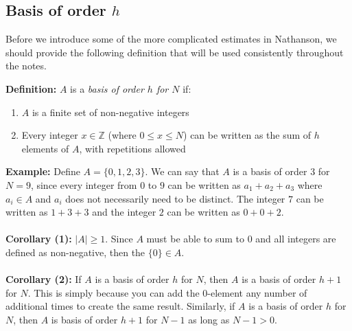 \documentclass[8pt]{extarticle}
\begin{document}
\subsection{Basis of order $h$}
Before we introduce some of the more complicated estimates in Nathanson, we should provide the following definition that will be used consistently throughout the notes. 
\begin{boxedsection}
\textbf{Definition:} $A$ is a \textit{basis of order $h$ for $N$} if:
\begin{enumerate}
    \item $A$ is a finite set of non-negative integers
    \item Every integer $x \in \mathbb{Z}$ (where $0 \leq x \leq N$) can be written as the sum of $h$ elements of $A$, with repetitions allowed
\end{enumerate}
\textbf{Example:} Define $A = \{0,1,2,3\}$. We can say that $A$ is a basis of order $3$ for $N = 9$, since every integer from $0$ to $9$ can be written as $a_1 + a_2 + a_3$ where $a_i \in A$ and $a_i$ does not necessarily need to be distinct. The integer $7$ can be written as $1 + 3 + 3$ and the integer $2$ can be written as $0 + 0 + 2$. \\
\\
\textbf{Corollary (1):} $|A| \geq 1$. Since $A$ must be able to sum to $0$ and all integers are defined as non-negative, then the $\{0\} \in A$.\\
\\
\textbf{Corollary (2):} If $A$ is a basis of order $h$ for $N$, then $A$ is a basis of order $h + 1$ for $N$. This is simply because you can add the $0$-element any number of additional times to create the same result. Similarly, if $A$ is a basis of order $h$ for $N$, then $A$ is basis of order $h + 1$ for $N - 1$ as long as $N - 1 > 0$.
\end{boxedsection}
\end{document}

